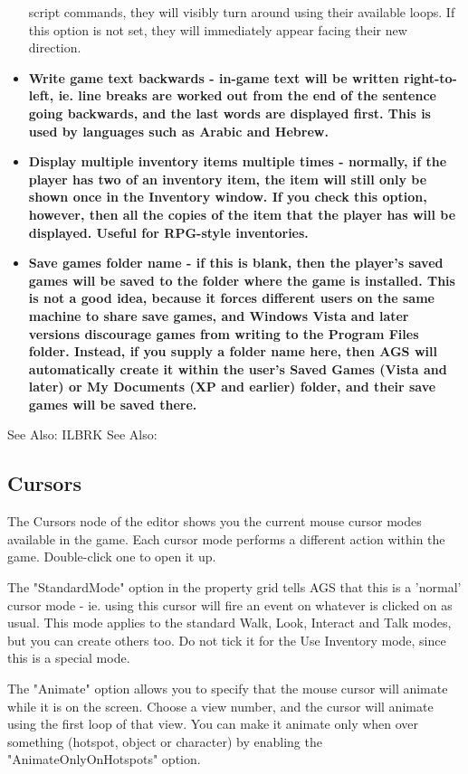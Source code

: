 \begin{itemize}
script commands, they will visibly turn around using their available loops.
If this option is not set, they will immediately appear facing their new direction.
\item \bf{Write game text backwards} - in-game text will be written right-to-left, ie. line
breaks are worked out from the end of the sentence going backwards, and the last words
are displayed first. This is used by languages such as Arabic and Hebrew.
\item \bf{Display multiple inventory items multiple times} - normally, if the player has
two of an inventory item, the item will still only be shown once in the Inventory window.
If you check this option, however, then all the copies of the item that the player has
will be displayed. Useful for RPG-style inventories.
\item \bf{Save games folder name} - if this is blank, then the player's saved games will
be saved to the folder where the game is installed. This is not a good idea, because it
forces different users on the same machine to share save games, and Windows Vista and later versions discourage
games from writing to the Program Files folder. Instead, if you supply a folder name here,
then AGS will automatically create it within the user's Saved Games (Vista and later) or My Documents
(XP and earlier) folder, and their save games will be saved there.
\end{itemize}

See Also:  ILBRK
See Also: 


\subsection{Cursors}%

The Cursors node of the editor shows you the current mouse cursor modes available in
the game. Each cursor mode performs a different action within the game. Double-click
one to open it up.

The "StandardMode" option in the property grid tells AGS that this is a 'normal' cursor mode - ie.
using this cursor will fire an event on whatever is clicked on as usual. This
mode applies to the standard Walk, Look, Interact and Talk modes, but you can create
others too. Do not tick it for the Use Inventory mode, since this is a special mode.

The "Animate" option allows you to specify that the mouse cursor will animate while it
is on the screen. Choose a view number, and the cursor will animate using the first
loop of that view. You can make it animate only when over something (hotspot, object
or character) by enabling the "AnimateOnlyOnHotspots" option.

